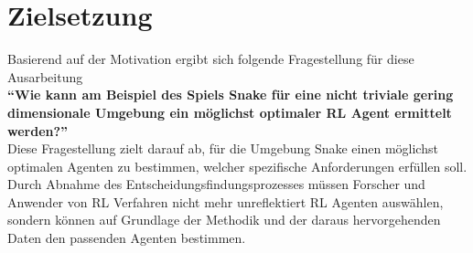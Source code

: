 \section{Zielsetzung} \label{sec:Einleitung_Forschungsfrage}
Basierend auf der Motivation ergibt sich folgende Fragestellung für diese Ausarbeitung\\
\textbf{"`Wie kann am Beispiel des Spiels Snake für eine nicht triviale gering dimensionale Umgebung ein möglichst optimaler RL Agent ermittelt werden?"'}\\
Diese Fragestellung zielt darauf ab, für die Umgebung Snake einen möglichst optimalen Agenten zu bestimmen, welcher spezifische Anforderungen erfüllen soll.\\
Durch Abnahme des Entscheidungsfindungsprozesses müssen Forscher und Anwender von RL Verfahren nicht mehr unreflektiert RL Agenten auswählen, sondern können auf Grundlage der Methodik und der daraus hervorgehenden Daten den passenden Agenten bestimmen.

